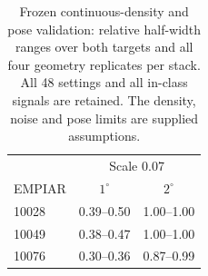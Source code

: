 \begin{table}[t]
\centering\small\setlength{\tabcolsep}{3pt}
\caption{Frozen continuous-density and pose validation: relative half-width ranges over both targets and all four geometry replicates per stack. All 48 settings and all in-class signals are retained. The density, noise and pose limits are supplied assumptions.}
\label{tab:frozenmoments}
\begin{tabular}{lcc}
\toprule
 & \multicolumn{2}{c}{Scale 0.07} \\
EMPIAR & $1^\circ$ & $2^\circ$ \\
\midrule
10028 & 0.39--0.50 & 1.00--1.00 \\
10049 & 0.38--0.47 & 1.00--1.00 \\
10076 & 0.30--0.36 & 0.87--0.99 \\
\bottomrule
\end{tabular}
\end{table}
